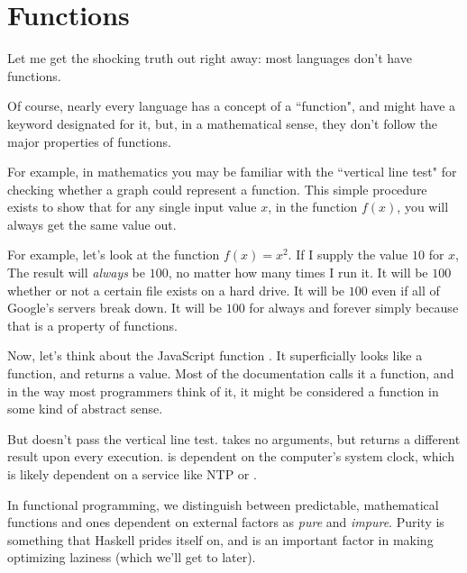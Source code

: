 \chapter{Functions}

Let me get the shocking truth out right away: most languages don't have functions.  

Of course, nearly every language has a concept of a ``function", and might have a keyword designated for it, but, in a mathematical sense, they don't follow the major properties of functions.  

For example, in mathematics you may be familiar with the ``vertical line test" for checking whether a graph could represent a function. This simple procedure exists to show that for any single input value $ x $, in the function $f\left(x\right)$, you will always get the same value out.  

For example, let's look at the function $ f\left( x \right) = x ^ 2 $. If I supply the value $ 10 $ for $ x $, The result will \textit{always} be $ 100 $, no matter how many times I run it.  It will be $ 100 $ whether or not a certain file exists on a hard drive. It will be $100$ even if all of Google's servers break down.  It will be $100$ for always and forever simply because that is a property of functions. 

Now, let's think about the JavaScript function .  It superficially looks like a function, and returns a value.  Most of the documentation calls it a function, and in the way most programmers think of it, it might be considered a function in some kind of abstract sense. 

But  doesn't pass the vertical line test.  takes no arguments, but returns a different result upon every execution.   is dependent on the computer's system clock, which is likely dependent on a service like NTP or . 

In functional programming, we distinguish between predictable, mathematical functions and ones dependent on external factors as \textit{pure} and \textit{impure}.  Purity is something that Haskell prides itself on, and is an important factor in making optimizing laziness (which we'll get to later). 


